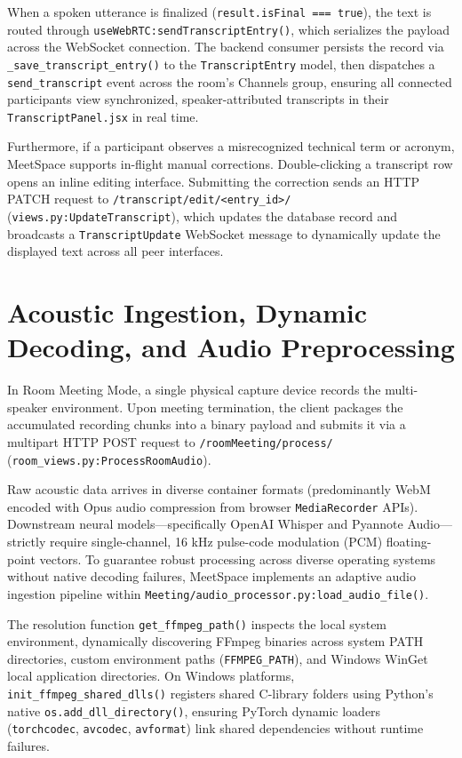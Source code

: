 \documentclass[12pt,oneside,letterpaper]{report}
\numberwithin{equation}{chapter} %
\begin{document}
When a spoken utterance is finalized (\texttt{result.isFinal === true}), the text is routed through \texttt{useWebRTC:sendTranscriptEntry()}, which serializes the payload across the WebSocket connection. The backend consumer persists the record via \texttt{\_save\_transcript\_entry()} to the \texttt{TranscriptEntry} model, then dispatches a \texttt{send\_transcript} event across the room's Channels group, ensuring all connected participants view synchronized, speaker-attributed transcripts in their \texttt{TranscriptPanel.jsx} in real time.

Furthermore, if a participant observes a misrecognized technical term or acronym, MeetSpace supports in-flight manual corrections. Double-clicking a transcript row opens an inline editing interface. Submitting the correction sends an HTTP PATCH request to \texttt{/transcript/edit/<entry\_id>/} (\texttt{views.py:UpdateTranscript}), which updates the database record and broadcasts a \texttt{TranscriptUpdate} WebSocket message to dynamically update the displayed text across all peer interfaces.

\section{Acoustic Ingestion, Dynamic Decoding, and Audio Preprocessing}
In Room Meeting Mode, a single physical capture device records the multi-speaker environment. Upon meeting termination, the client packages the accumulated recording chunks into a binary payload and submits it via a multipart HTTP POST request to \texttt{/roomMeeting/process/} (\texttt{room\_views.py:ProcessRoomAudio}).

Raw acoustic data arrives in diverse container formats (predominantly WebM encoded with Opus audio compression from browser \texttt{MediaRecorder} APIs). Downstream neural models---specifically OpenAI Whisper and Pyannote Audio---strictly require single-channel, 16 kHz pulse-code modulation (PCM) floating-point vectors. To guarantee robust processing across diverse operating systems without native decoding failures, MeetSpace implements an adaptive audio ingestion pipeline within \texttt{Meeting/audio\_processor.py:load\_audio\_file()}.

The resolution function \texttt{get\_ffmpeg\_path()} inspects the local system environment, dynamically discovering FFmpeg binaries across system PATH directories, custom environment paths (\texttt{FFMPEG\_PATH}), and Windows WinGet local application directories. On Windows platforms, \texttt{init\_ffmpeg\_shared\_dlls()} registers shared C-library folders using Python's native \texttt{os.add\_dll\_directory()}, ensuring PyTorch dynamic loaders (\texttt{torchcodec}, \texttt{avcodec}, \texttt{avformat}) link shared dependencies without runtime failures.
\end{document}
